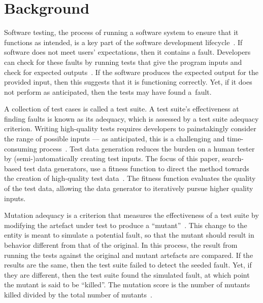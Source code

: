 \section{Background}\label{sec:background}


Software testing, the process of running a software system to ensure that it functions as intended, is a key part of the
software development lifecycle~\cite{Kapfhammer2004}. If software does not meet users' expectations, then it contains a
fault. Developers can check for these faults by running tests that give the program inputs and check for expected
outputs~\cite{Kapfhammer2010}. If the software produces the expected output for the provided input, then this suggests
that it is functioning correctly. Yet, if it does not perform as anticipated, then the tests may have found \mbox{a
fault}.


A collection of test cases is called a test suite. A test suite's effectiveness at finding faults is known as its
adequacy, which is assessed by a test suite adequacy criterion.  Writing high-quality tests requires developers to
painstakingly consider the range of possible inputs --- as anticipated, this is a challenging and time-consuming
process~\cite{Fraser2015}. Test data generation reduces the burden on a human tester by (semi-)automatically creating
test inputs.  The focus of this paper, search-based test data generators, use a fitness function to direct the
method towards the creation of high-quality test data~\cite{STVR:STVR294}. The fitness function evaluates the quality of
the test data, allowing the data generator to iteratively pursue higher quality inputs.


Mutation adequacy is a criterion that measures the effectiveness of a test suite by modifying the artefact under test to
produce a ``mutant''~\cite{Just2011a}. This change to the entity is meant to simulate a potential fault, so that the
mutant should result in behavior different from that of the original. In this process, the result from running the tests
against the original and mutant artefacts are compared. If the results are the same, then the test suite failed to
detect the seeded fault.  Yet, if they are different, then the test suite found the simulated fault, at which point the
mutant is said to be ``killed''.  The mutation score is the number of mutants killed divided by the total number of
mutants~\cite{Just2012b}.

